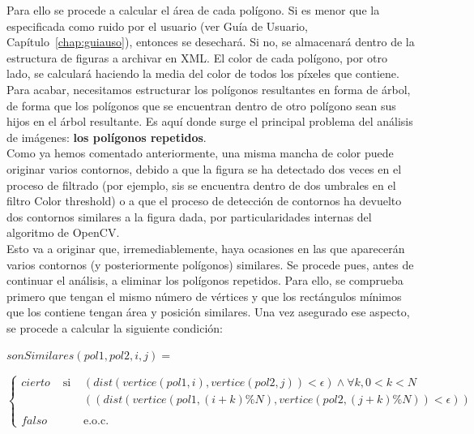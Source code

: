 {	Para ello se procede a calcular el área de cada polígono. Si es menor que la especificada como ruido por el usuario (ver Guía de Usuario, Capítulo~\ref{chap:guiauso}), entonces se desechará. Si no, se almacenará dentro de la estructura de figuras a archivar en XML. El color de cada polígono, por otro lado, se calculará haciendo la media del color de todos los píxeles que contiene.\\
	
	Para acabar, necesitamos estructurar los polígonos resultantes en forma de árbol, de forma que los polígonos que se encuentran dentro de otro polígono sean sus hijos en el árbol resultante. Es aquí donde surge el principal problema del análisis de imágenes: \textbf{los polígonos repetidos}.\\
	
	Como ya hemos comentado anteriormente, una misma mancha de color puede originar varios contornos, debido a que la figura se ha detectado dos veces en el proceso de filtrado (por ejemplo, sis se encuentra dentro de dos umbrales en el filtro Color threshold) o a que el proceso de detección de contornos ha devuelto dos contornos similares a la figura dada, por particularidades internas del algoritmo de OpenCV.\\
	
	Esto va a originar que, irremediablemente, haya ocasiones en las que aparecerán varios contornos (y posteriormente polígonos) similares. Se procede pues, antes de continuar el análisis, a eliminar los polígonos repetidos. Para ello, se comprueba primero que tengan el mismo número de vértices y que los rectángulos mínimos que los contiene tengan área y posición similares. Una vez asegurado ese aspecto, se procede a calcular la siguiente condición:
	
	\begin{center}
		$sonSimilares(pol1,pol2,i,j) =$
	\end{center}
	\begin{center}
		
		$\left\{
		\begin{array}{ccc}
		cierto 	& \text{ si } & (dist(vertice(pol1,i), vertice(pol2,j)) < \epsilon)\wedge \forall k, 0 < k < N \\
				&             &  ((dist(vertice(pol1,(i + k) \%N), vertice(pol2,(j + k)\%N)) < \epsilon))\\
		 & & \\
		falso 	& 	          & \text{e.o.c.}
		\end{array}\right.$
		\end{center}
	
}
